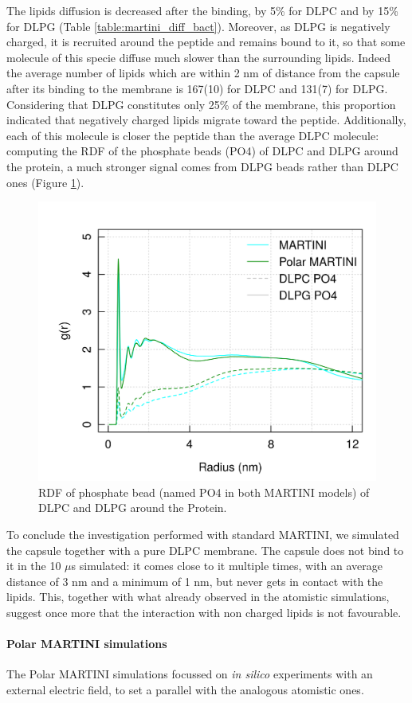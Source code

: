 %
The lipids diffusion is decreased after the binding, by 5\% for DLPC and by 15\% for DLPG (Table \ref{table:martini_diff_bact}). Moreover, as DLPG is negatively charged, it is recruited around the peptide and remains bound to it, so that some molecule of this specie diffuse much slower than the surrounding lipids. Indeed the average number of lipids which are within 2 nm of distance from the capsule after its binding to the membrane is 167(10) for DLPC and 131(7) for DLPG. Considering that DLPG constitutes only 25\% of the membrane, this proportion indicated that negatively charged lipids migrate toward the peptide.
%
Additionally, each of this molecule is closer the peptide than the average DLPC molecule: computing the RDF of the phosphate beads (PO4) of DLPC and DLPG around the protein, a much stronger signal comes from DLPG beads rather than DLPC ones (Figure \ref{fig:PO4_RDF}).
%
\begin{figure}[t!]
\centering\includegraphics[width=0.6\linewidth]{3results_capsule/pics/RDF_PO4_around_Prot.png} 
\caption[Proximity of lipids phosphate to bound capsule]{RDF of phosphate bead (named PO4 in both MARTINI models) of DLPC and DLPG around the Protein.}
\label{fig:PO4_RDF}
\end{figure}

To conclude the investigation performed with standard MARTINI, we simulated the capsule together with a pure DLPC membrane. The capsule does not bind to it in the 10 $\mu$s simulated: it comes close to it multiple times, with an average distance of 3 nm and a minimum of 1 nm, but never gets in contact with the lipids. This, together with what already observed in the atomistic simulations, suggest once more that the interaction with non charged lipids is not favourable.

\paragraph{Polar MARTINI simulations} 
The Polar MARTINI simulations focussed on \emph{in silico} experiments with an external electric field, to set a parallel with the analogous atomistic ones.

